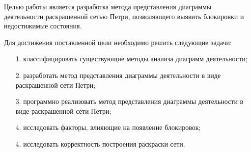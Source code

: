 Целью работы является разработка метода представления диаграммы деятельности раскрашенной сетью Петри, позволяющего выявить блокировки и недостижимые состояния.

Для достижения поставленной цели необходимо решить следующие задачи:
\begin{itemize}
\item[1.] классифицировать существующие методы анализа диаграмм деятельности;
\item[2.] разработать метод представления диаграммы деятельности в виде раскрашенной сети Петри;
\item[3.] программно реализовать метод представления диаграммы деятельности в виде раскрашенной сети Петри;
\item[4.] исследовать факторы, влияющие на появление блокировок;
\item[4.] исследовать корректность построения раскраски сети.
\end{itemize}
